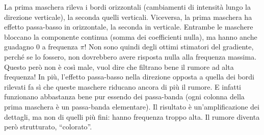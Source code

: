 \documentclass[a4paper,11pt]{article}
\begin{document}
\begin{figure}[h!]
\centering
{}
\qquad
{}
\end{figure}
\par
La prima maschera rileva i bordi orizzontali (cambiamenti di intensità lungo la direzione verticale), la seconda quelli verticali.
Viceversa, la prima maschera ha effetto passa-basso in orizzontale, la seconda in verticale.
Entrambe le maschere bloccano la componente continua (somma dei coefficienti nulla), ma hanno anche guadagno 0 a frequenza $\pi$! Non sono quindi degli
ottimi stimatori del gradiente, perché se lo fossero, non dovrebbero avere risposta nulla alla frequenza massima. Questo però
non è così male, vuol dire che filtrano bene il rumore ad alta frequenza! In più, l'effetto passa-basso nella direzione opposta a quella dei bordi
rilevati fa sì che queste maschere riducano ancora di più il rumore. E infatti funzionano abbastanza bene pur essendo dei
passa-banda (ogni colonna della prima maschera è un passa-banda elementare). Il risultato è un'amplificazione dei dettagli, ma non di quelli più fini:
hanno frequenza troppo alta. Il rumore diventa però strutturato, ``colorato''.
\end{document}
